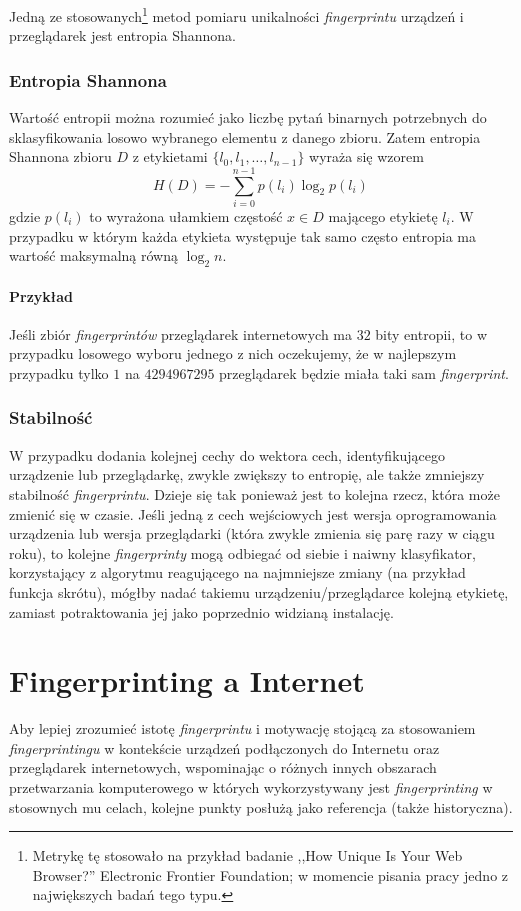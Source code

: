 Jedną ze stosowanych\footnote{Metrykę tę stosowało na przykład badanie ,,How
	Unique Is Your Web Browser?'' Electronic Frontier Foundation; w momencie
pisania pracy jedno z największych badań tego typu.} metod pomiaru unikalności
\emph{fingerprintu} urządzeń i przeglądarek jest entropia Shannona.

\subsubsection{Entropia Shannona}
Wartość entropii można rozumieć jako liczbę pytań binarnych potrzebnych do
sklasyfikowania losowo wybranego elementu z danego zbioru. Zatem entropia
Shannona zbioru \(D\) z etykietami \(\{l_{0}, l_{1}, \dots, l_{n - 1}\}\) wyraża
się wzorem \[H(D) = -{\sum_{i = 0}^{n - 1}{p(l_{i})\log_{2}{p(l_{i})}}}\] gdzie
\(p(l_{i})\) to wyrażona ułamkiem częstość \(x \in D\) mającego etykietę
\(l_{i}\). W przypadku w którym każda etykieta występuje tak samo często
entropia ma wartość maksymalną równą \(\log_{2}{n}\).

\paragraph{Przykład}
Jeśli zbiór \emph{fingerprintów} przeglądarek internetowych ma \(32\) bity
entropii, to w przypadku losowego wyboru jednego z nich oczekujemy, że w
najlepszym przypadku tylko \(1\) na \(4294967295\) przeglądarek będzie miała
taki sam \emph{fingerprint}.

\subsubsection{Stabilność}
W przypadku dodania kolejnej cechy do wektora cech, identyfikującego urządzenie
lub przeglądarkę, zwykle zwiększy to entropię, ale także zmniejszy stabilność
\emph{fingerprintu}. Dzieje się tak ponieważ jest to kolejna rzecz, która może
zmienić się w czasie. Jeśli jedną z cech wejściowych jest wersja oprogramowania
urządzenia lub wersja przeglądarki (która zwykle zmienia się parę razy w ciągu
roku), to kolejne \emph{fingerprinty} mogą odbiegać od siebie i naiwny
klasyfikator, korzystający z algorytmu reagującego na najmniejsze zmiany (na
przykład funkcja skrótu), mógłby nadać takiemu urządzeniu/przeglądarce kolejną
etykietę, zamiast potraktowania jej jako poprzednio widzianą instalację.

\section{Fingerprinting a Internet} %
Aby lepiej zrozumieć istotę \emph{fingerprintu} i motywację stojącą za
stosowaniem \emph{fingerprintingu} w kontekście urządzeń podłączonych do
Internetu oraz przeglądarek internetowych, wspominając o różnych innych
obszarach przetwarzania komputerowego w których wykorzystywany jest
\emph{fingerprinting} w stosownych mu celach, kolejne punkty posłużą jako
referencja (także historyczna).

